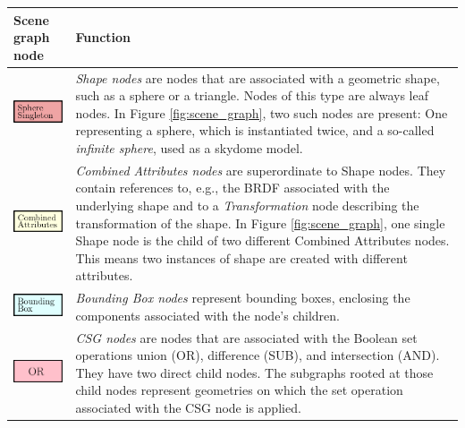 \begin{table}
  \centering
  {\footnotesize
    \begin{tabular}{m{3cm}m{8cm}}
      \toprule
      Scene graph node & Function  \\
      \midrule
      \includegraphics[scale=0.5]{img/2 art/shape_node.png} & \emph{Shape nodes} are nodes that are associated with a geometric shape, such as a sphere or a triangle. Nodes of this type are always leaf nodes. In Figure \ref{fig:scene_graph}, two such nodes are present: One representing a sphere, which is instantiated twice, and a so-called \emph{infinite sphere}, used as a skydome model.
  	  \\
      \midrule
      \includegraphics[scale=0.5]{img/2 art/comb_attr_node.png} & \emph{Combined Attributes nodes} are superordinate to Shape nodes. They contain references to, e.g., the BRDF associated with the underlying shape and to a \emph{Transformation} node describing the transformation of the shape. In Figure \ref{fig:scene_graph}, one single Shape node is the child of two different Combined Attributes nodes. This means two instances of shape are created with different attributes.
      \\
      \midrule
    \includegraphics[scale=0.5]{img/2 art/bounding_box.png} & \emph{Bounding Box nodes}
    represent
    bounding
    boxes,
    enclosing
    the
    components
    associated with the node's children. \\
      \midrule
     \includegraphics[scale=0.5]{img/2 art/or.png} & \emph{CSG nodes} are nodes that are associated with the Boolean set operations union (OR), difference (SUB), and intersection (AND). They have two direct child nodes. The subgraphs rooted at those child nodes represent geometries on which the set operation associated with the CSG node is applied.\\

\end{tabular}}
\end{table}
